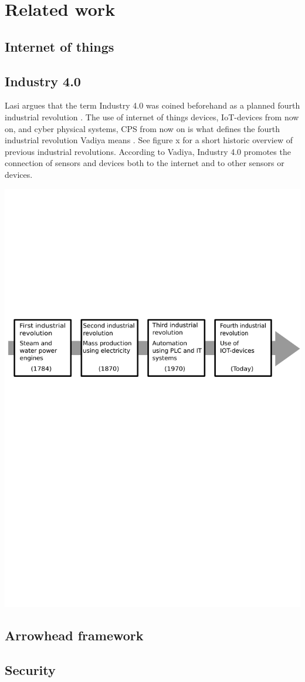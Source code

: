 
\section{Related work}

\subsection{Internet of things}

\subsection{Industry 4.0}
Lasi argues that the term Industry 4.0 was coined beforehand as a planned fourth industrial revolution \cite{lasi}.
The use of internet of things devices, IoT-devices from now on, and cyber physical systems, CPS from now on is what defines the fourth industrial revolution Vadiya means \cite{Vadiya}.
See figure x for a short historic overview of previous industrial revolutions.
According to Vadiya, Industry 4.0 promotes the connection of sensors and devices both to the internet and to other sensors or devices.



\includegraphics[width=\textwidth]{Pictures/Industrial_revolution.pdf}
\subsection{Arrowhead framework}
\subsection{Security}
